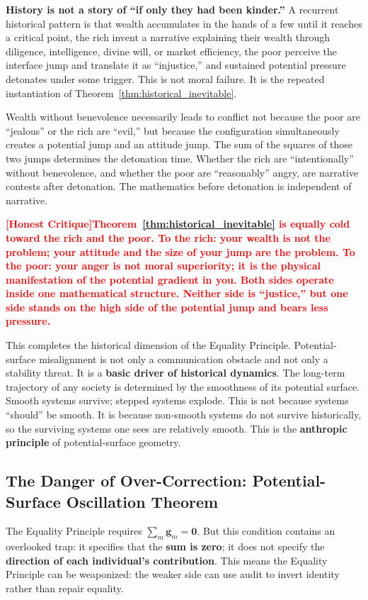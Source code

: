 \documentclass[12pt,a4paper]{article}
\theoremstyle{remark}
\newcommand{\honestcrit}[1]{%
    \textcolor{red}{\textbf{[Honest Critique]#1}}%
}
\begin{document}
\textbf{History is not a story of ``if only they had been kinder.''} A recurrent historical pattern is that wealth accumulates in the hands of a few until it reaches a critical point, the rich invent a narrative explaining their wealth through diligence, intelligence, divine will, or market efficiency, the poor perceive the interface jump and translate it as ``injustice,'' and sustained potential pressure detonates under some trigger. This is not moral failure. It is the repeated instantiation of Theorem~\ref{thm:historical_inevitable}.

Wealth without benevolence necessarily leads to conflict not because the poor are ``jealous'' or the rich are ``evil,'' but because the configuration simultaneously creates a potential jump and an attitude jump. The sum of the squares of those two jumps determines the detonation time. Whether the rich are ``intentionally'' without benevolence, and whether the poor are ``reasonably'' angry, are narrative contests after detonation. The mathematics before detonation is independent of narrative.

\honestcrit{Theorem~\ref{thm:historical_inevitable} is equally cold toward the rich and the poor. To the rich: your wealth is not the problem; your attitude and the size of your jump are the problem. To the poor: your anger is not moral superiority; it is the physical manifestation of the potential gradient in you. Both sides operate inside one mathematical structure. Neither side is ``justice,'' but one side stands on the high side of the potential jump and bears less pressure.}

This completes the historical dimension of the Equality Principle. Potential-surface misalignment is not only a communication obstacle and not only a stability threat. It is a \textbf{basic driver of historical dynamics}. The long-term trajectory of any society is determined by the smoothness of its potential surface. Smooth systems survive; stepped systems explode. This is not because systems ``should'' be smooth. It is because non-smooth systems do not survive historically, so the surviving systems one sees are relatively smooth. This is the \textbf{anthropic principle} of potential-surface geometry.

\subsection{The Danger of Over-Correction: Potential-Surface Oscillation Theorem}

The Equality Principle requires $\sum_m \mathbf{g}_m = \mathbf{0}$. But this condition contains an overlooked trap: it specifies that the \textbf{sum is zero}; it does not specify the \textbf{direction of each individual's contribution}. This means the Equality Principle can be weaponized: the weaker side can use audit to invert identity rather than repair equality.
\end{document}
